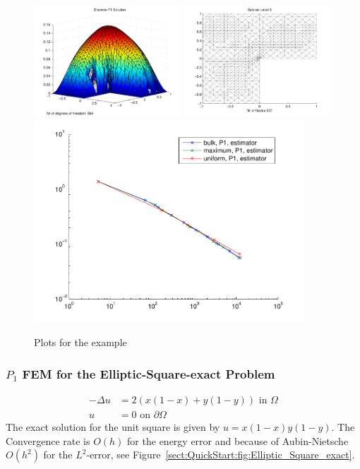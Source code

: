 \begin{figure}[ht!]
\includegraphics[width= 0.49\textwidth]{images/sect_QuickStart_Elliptic_Lshape_U}
\includegraphics[width= 0.49\textwidth]{images/sect_QuickStart_Elliptic_Lshape_Mesh}\bigskip\\
\includegraphics[width=0.9\textwidth]{images/sect_QuickStart_Elliptic_Lshape_Error}
\caption{ Plots for the example }
\label{sect:QuickStart:fig:Elliptic_Lshape}
\end{figure}

\clearpage

\subsubsection{$P_1$ FEM for the Elliptic-Square-exact Problem}
\begin{align*}
-\Delta u &= 2(x(1-x)+y(1-y)) \textrm{ in } \Omega\\
 u &= 0 \textrm{ on } \partial\Omega
\end{align*}
The exact solution for the unit square is given by $u=x(1-x)y(1-y)$. 
The Convergence rate is $O(h)$ for the energy error and because of Aubin-Nietsche $O(h^2)$ for the $L^2$-error, see Figure~\ref{sect:QuickStart:fig:Elliptic_Square_exact}.\bigskip

